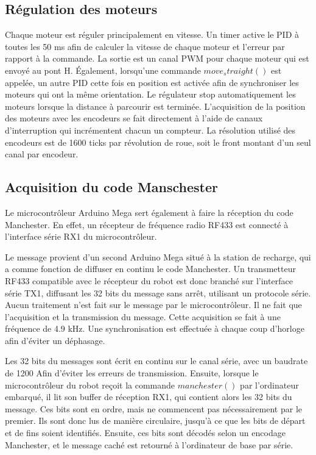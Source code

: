 \subsection{Régulation des moteurs}

Chaque moteur est réguler principalement en vitesse. Un timer active le PID à toutes les 50 ms afin de calculer la vitesse de chaque moteur et l’erreur par rapport à la commande. La sortie est un canal PWM pour chaque moteur qui est envoyé au pont H. Également, lorsqu’une commande $move_straight()$ est appelée, un autre PID cette fois en position est activée afin de synchroniser les moteurs qui ont la même orientation. Le régulateur stop automatiquement les moteurs lorsque la distance à parcourir est terminée. L'acquisition de la position des moteurs avec les encodeurs se fait directement à l’aide de canaux d’interruption qui incrémentent chacun un compteur. La résolution utilisé des encodeurs est de 1600 ticks par révolution de roue, soit le front montant d’un seul canal par encodeur.


\subsection{Acquisition du code Manschester}

Le microcontrôleur Arduino Mega sert également à faire la réception du code Manchester. En effet, un récepteur de fréquence radio RF433 est connecté à l’interface série RX1 du microcontrôleur.

Le message provient d’un second Arduino Mega situé à la station de recharge, qui a comme fonction de diffuser en continu le code Manchester. Un transmetteur RF433 compatible avec le récepteur du robot est donc branché sur l’interface série TX1, diffusant les 32 bits du message sans arrêt, utilisant un protocole série. Aucun traitement n’est fait sur le message par le microcontrôleur. Il ne fait que l’acquisition et la transmission du message. Cette acquisition se fait à une fréquence de 4.9 kHz. Une synchronisation est effectuée à chaque coup d’horloge afin d’éviter un déphasage.

Les 32 bits du messages sont écrit en continu sur le canal série, avec un baudrate de 1200 Afin d’éviter les erreurs de transmission. Ensuite, lorsque le microcontrôleur du robot reçoit la commande $manchester()$ par l’ordinateur embarqué, il lit son buffer de réception RX1, qui contient alors les 32 bits du message. Ces bits sont en ordre, mais ne commencent pas nécessairement par le premier. Ils sont donc lus de manière circulaire, jusqu’à ce que les bits de départ et de fins soient identifiés. Ensuite, ces bits sont décodés selon un encodage Manchester, et le message caché est retourné à l’ordinateur de base par série.

